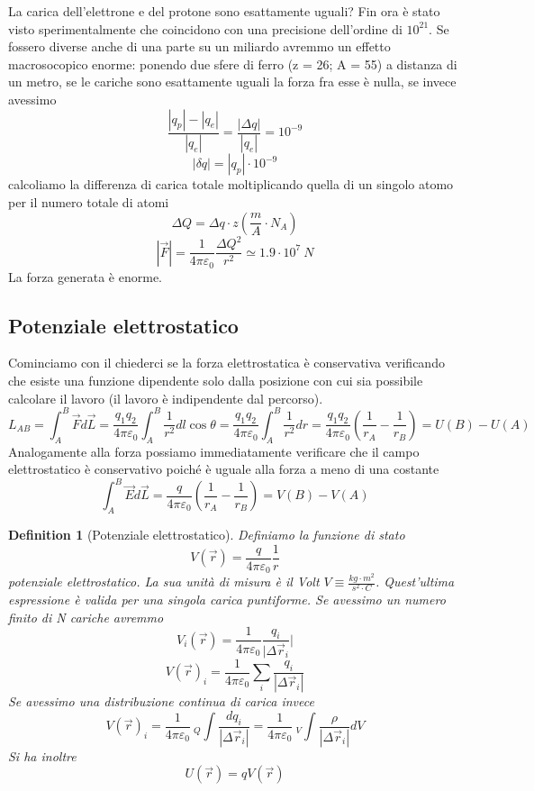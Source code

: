 \documentclass[10pt,a4paper]{article}
\newtheorem{definition}{Definition}
\begin{document}
La carica dell'elettrone e del protone sono esattamente uguali? Fin ora è stato visto sperimentalmente che coincidono con una precisione dell'ordine di \(10^{21}\). Se fossero diverse anche di una parte su un miliardo avremmo un effetto macrosocopico enorme: ponendo due sfere di ferro (z = 26; A = 55) a distanza di un metro, se le cariche sono esattamente uguali la forza fra esse è nulla, se invece avessimo 
\[\frac{|q_p|-|q_e|}{|q_e|} = \frac{|\Delta q|}{|q_e|}=10^{-9}\]
\[|\delta q| = |q_p|\cdot10^{-9}\]
calcoliamo la differenza di carica totale moltiplicando quella di un singolo atomo per il numero totale di atomi
\[\Delta Q = \Delta q\cdot z \left(\frac{m}{A}\cdot N_A\right) \]
\[|\vec{F}|=\frac{1}{4\pi\varepsilon_0}\frac{\Delta Q^2}{r^2}\simeq 1.9\cdot10^{7}\ N\]
La forza generata è enorme. 
\subsection{Potenziale elettrostatico}
Cominciamo con il chiederci se la forza elettrostatica è conservativa verificando che esiste una funzione dipendente solo dalla posizione con cui sia possibile calcolare il lavoro (il lavoro è indipendente dal percorso). 
\[L_{AB} = \int_{A}^{B}\vec{F}d\vec{L}= \frac{q_1q_2}{4\pi\varepsilon_0}\int_{A}^{B}\frac{1}{r^2}dl\cos\theta=\frac{q_1q_2}{4\pi\varepsilon_0}\int_{A}^{B}\frac{1}{r^2}dr=\frac{q_1q_2}{4\pi\varepsilon_0}\left(\frac{1}{r_A}-\frac{1}{r_B}\right)=U(B)-U(A)\]
Analogamente alla forza possiamo immediatamente verificare che il campo elettrostatico è conservativo poiché è uguale alla forza a meno di una costante
\[\int_{A}^{B}\vec{E}d\vec{L}=\frac{q}{4\pi\varepsilon_0}\left(\frac{1}{r_A}-\frac{1}{r_B}\right)=V(B)-V(A)\]
\begin{definition}[Potenziale elettrostatico]
Definiamo la funzione di stato 
\[V(\vec{r}) = \frac{q}{4\pi\varepsilon_0}\frac{1}{r}\]
potenziale elettrostatico. La sua unità di misura è il Volt $V \equiv \frac{kg\cdot m^2}{s^2\cdot C}$.  Quest'ultima espressione è valida per una singola carica puntiforme. Se avessimo un numero finito di N cariche avremmo
\[V_i(\vec{r}) = \frac{1}{4\pi\varepsilon_0}\frac{q_i}{|\Delta \vec{r}_i}|\]
\[V(\vec{r})_i= \frac{1}{4\pi\varepsilon_0}\sum_{i}\frac{q_i}{|\Delta \vec{r}_i|}\]
Se avessimo una distribuzione continua di carica invece
\[V(\vec{r})_i= \frac{1}{4\pi\varepsilon_0}\ _Q\int\frac{d q_i}{|\Delta \vec{r}_i|} =  \frac{1}{4\pi\varepsilon_0}\ _V\int\frac{\rho}{|\Delta \vec{r}_i|}dV\]
Si ha inoltre 
\[U(\vec{r})=qV(\vec{r})\]
\end{definition}
\end{document}
